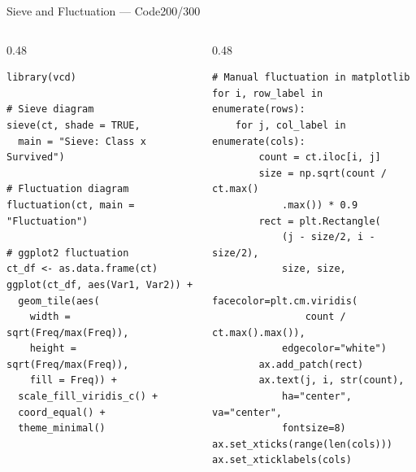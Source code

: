 \documentclass[10pt]{beamer}
\newcommand{\smark}[1]{\hfill{\scriptsize\color{codegray}#1}}
\begin{document}
\begin{frame}[fragile]{Sieve and Fluctuation --- Code}\smark{200/300}
\begin{columns}[T]
\begin{column}{0.48\textwidth}
\begin{lstlisting}[style=Rstyle]
library(vcd)

# Sieve diagram
sieve(ct, shade = TRUE,
  main = "Sieve: Class x Survived")

# Fluctuation diagram
fluctuation(ct, main = "Fluctuation")

# ggplot2 fluctuation
ct_df <- as.data.frame(ct)
ggplot(ct_df, aes(Var1, Var2)) +
  geom_tile(aes(
    width = sqrt(Freq/max(Freq)),
    height = sqrt(Freq/max(Freq)),
    fill = Freq)) +
  scale_fill_viridis_c() +
  coord_equal() +
  theme_minimal()
\end{lstlisting}
\end{column}
\begin{column}{0.48\textwidth}
\begin{lstlisting}[style=Pystyle]
# Manual fluctuation in matplotlib
for i, row_label in enumerate(rows):
    for j, col_label in enumerate(cols):
        count = ct.iloc[i, j]
        size = np.sqrt(count / ct.max()
            .max()) * 0.9
        rect = plt.Rectangle(
            (j - size/2, i - size/2),
            size, size,
            facecolor=plt.cm.viridis(
                count / ct.max().max()),
            edgecolor="white")
        ax.add_patch(rect)
        ax.text(j, i, str(count),
            ha="center", va="center",
            fontsize=8)
ax.set_xticks(range(len(cols)))
ax.set_xticklabels(cols)
\end{lstlisting}
\end{column}
\end{columns}
\end{frame}
\end{document}
